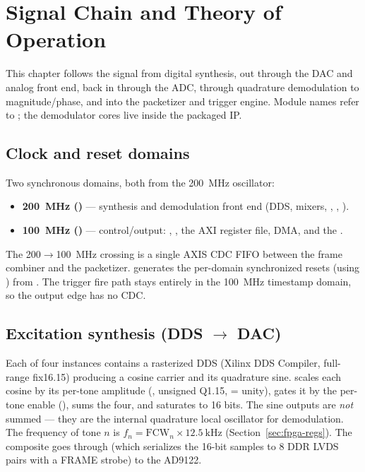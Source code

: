 \chapter{Signal Chain and Theory of Operation}
\label{ch:signal}

This chapter follows the signal from digital synthesis, out through the DAC and
analog front end, back in through the ADC, through quadrature demodulation to
magnitude/phase, and into the packetizer and trigger engine. Module names refer
to ; the demodulator cores live inside
the packaged  IP.

\section{Clock and reset domains}
Two synchronous domains, both from the \SI{200}{\mega\hertz} oscillator:
\begin{itemize}[nosep]
  \item \textbf{\SI{200}{\mega\hertz} ()} --- synthesis and
    demodulation front end (DDS, mixers, ,
    , ).
  \item \textbf{\SI{100}{\mega\hertz} ()} --- control/output:
    , , the AXI register
    file, DMA, and the .
\end{itemize}
The \SI{200}{}$\to$\SI{100}{\mega\hertz} crossing is a single AXIS CDC FIFO
between the frame combiner and the packetizer.  generates
the per-domain synchronized resets (using ) from
. The trigger fire path stays entirely in the
\SI{100}{\mega\hertz} timestamp domain, so the output edge has no CDC.

\section{Excitation synthesis (DDS $\to$ DAC)}
Each of four  instances contains a rasterized DDS
(Xilinx DDS Compiler, full-range fix16.15) producing a cosine carrier and its
quadrature sine.  scales each cosine by its per-tone
amplitude (, unsigned Q1.15,  = unity), gates
it by the per-tone enable (), sums the four, and saturates
to 16 bits. The sine outputs are \emph{not} summed --- they are the internal
quadrature local oscillator for demodulation. The frequency of tone $n$ is
$f_n = \text{FCW}_n \times \SI{12.5}{\kilo\hertz}$ (Section~\ref{sec:fpga-regs}).
The composite goes through  (which serializes the
16-bit samples to 8 DDR LVDS pairs with a FRAME strobe) to the AD9122.

